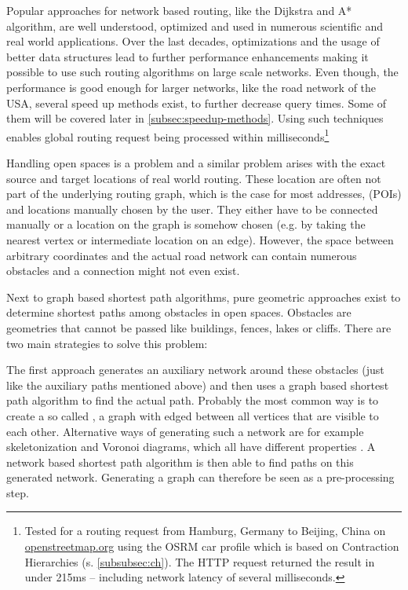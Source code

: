 	Popular approaches for network based routing, like the Dijkstra and A* algorithm, are well understood, optimized and used in numerous scientific and real world applications.
	Over the last decades, optimizations and the usage of better data structures lead to further performance enhancements making it possible to use such routing algorithms on large scale networks.
	Even though, the performance is good enough for larger networks, like the road network of the USA\cite[5]{aviram-optimizing-dijkstra}, several speed up methods exist, to further decrease query times.
	Some of them will be covered later in \cref{subsec:speedup-methods}.
	Using such techniques enables global routing request being processed within milliseconds\footnote{Tested for a routing request from Hamburg, Germany to Beijing, China on \href{https://www.openstreetmap.org/directions?engine=fossgis\_osrm\_car&route=53.55\%2C10.00\%3B39.91\%2C116.39}{openstreetmap.org} using the OSRM car profile which is based on Contraction Hierarchies (s. \cref{subsubsec:ch}). The HTTP request returned the result in under 215ms -- including network latency of several milliseconds.}
	
	Handling open spaces is a problem and a similar problem arises with the exact source and target locations of real world routing.
	These location are often not part of the underlying routing graph, which is the case for most addresses,  (POIs) and locations manually chosen by the user.
	They either have to be connected manually or a location on the graph is somehow chosen (e.g. by taking the nearest vertex or intermediate location on an edge).
	However, the space between arbitrary coordinates and the actual road network can contain numerous obstacles and a connection might not even exist.
	
	Next to graph based shortest path algorithms, pure geometric approaches exist to determine shortest paths among obstacles in open spaces.
	Obstacles are geometries that cannot be passed like buildings, fences, lakes or cliffs.
	There are two main strategies to solve this problem\cite[2]{hershberger-suri}:
	
	The first approach generates an auxiliary network around these obstacles (just like the auxiliary paths mentioned above) and then uses a graph based shortest path algorithm to find the actual path.
	Probably the most common way is to create a so called , a graph with edged between all vertices that are visible to each other.
	Alternative ways of generating such a network are for example skeletonization and Voronoi diagrams, which all have different properties \cite[3-4]{graser-osm-open-spaces}.
	A network based shortest path algorithm is then able to find paths on this generated network\cite[2]{hershberger-suri}.
	Generating a graph can therefore be seen as a pre-processing step.
	
